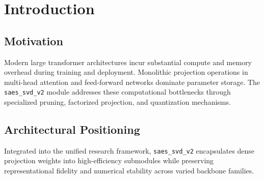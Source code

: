 \section{Introduction}

\subsection{Motivation}
Modern large transformer architectures incur substantial compute and memory overhead during training and deployment. Monolithic projection operations in multi-head attention and feed-forward networks dominate parameter storage. The \texttt{saes_svd_v2} module addresses these computational bottlenecks through specialized pruning, factorized projection, and quantization mechanisms.

\subsection{Architectural Positioning}
Integrated into the unified research framework, \texttt{saes_svd_v2} encapsulates dense projection weights into high-efficiency submodules while preserving representational fidelity and numerical stability across varied backbone families.
